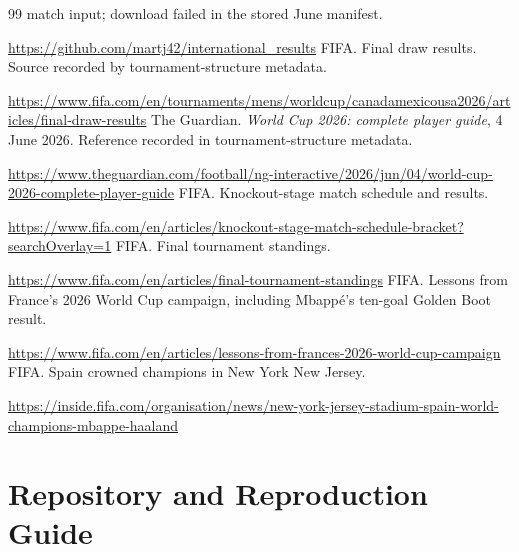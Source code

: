 \begin{thebibliography}{99}
match input; download failed in the stored June manifest.
\par\url{https://github.com/martj42/international_results}
 FIFA. Final draw results. Source recorded by tournament-structure metadata.
\par\url{https://www.fifa.com/en/tournaments/mens/worldcup/canadamexicousa2026/articles/final-draw-results}
 The Guardian. \emph{World Cup 2026: complete player guide},
4 June 2026. Reference recorded in tournament-structure metadata.
\par\url{https://www.theguardian.com/football/ng-interactive/2026/jun/04/world-cup-2026-complete-player-guide}
 FIFA. Knockout-stage match schedule and results.
\par\url{https://www.fifa.com/en/articles/knockout-stage-match-schedule-bracket?searchOverlay=1}
 FIFA. Final tournament standings.
\par\url{https://www.fifa.com/en/articles/final-tournament-standings}
 FIFA. Lessons from France's 2026 World Cup campaign,
including Mbapp\'{e}'s ten-goal Golden Boot result.
\par\url{https://www.fifa.com/en/articles/lessons-from-frances-2026-world-cup-campaign}
 FIFA. Spain crowned champions in New York New Jersey.
\par\url{https://inside.fifa.com/organisation/news/new-york-jersey-stadium-spain-world-champions-mbappe-haaland}
\end{thebibliography}
\clearpage
\appendix
\section{Repository and Reproduction Guide}
